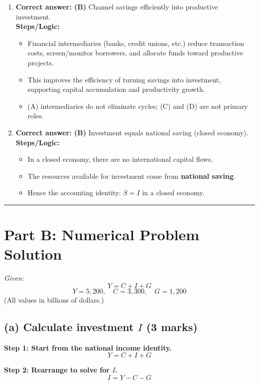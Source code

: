\documentclass[12pt]{article}
\begin{document}
\begin{enumerate}[label=\textbf{\arabic*.}]
\item \textbf{Correct answer: (B)} \; Channel savings efficiently into productive investment.\\
\textbf{Steps/Logic:}
\begin{itemize}
    \item Financial intermediaries (banks, credit unions, etc.) reduce transaction costs, screen/monitor borrowers, and allocate funds toward productive projects.
    \item This improves the efficiency of turning savings into investment, supporting capital accumulation and productivity growth.
    \item (A) intermediaries do not eliminate cycles; (C) and (D) are not primary roles.
\end{itemize}

\item \textbf{Correct answer: (B)} \; Investment equals national saving (closed economy).\\
\textbf{Steps/Logic:}
\begin{itemize}
    \item In a closed economy, there are no international capital flows.
    \item The resources available for investment come from \textbf{national saving}.
    \item Hence the accounting identity: \(\boxed{S = I}\) in a closed economy.
\end{itemize}

\end{enumerate}

\hrule
\vspace{1em}

\section*{Part B: Numerical Problem Solution}

\textit{Given:}
\[
Y = C + I + G
\]
\[
Y = 5{,}200,\quad C = 3{,}300,\quad G = 1{,}200
\]
(All values in billions of dollars.)

\subsection*{(a) Calculate investment \(I\) (3 marks)}

\textbf{Step 1: Start from the national income identity.}
\[
Y = C + I + G
\]

\textbf{Step 2: Rearrange to solve for \(I\).}
\[
I = Y - C - G
\]
\end{document}
